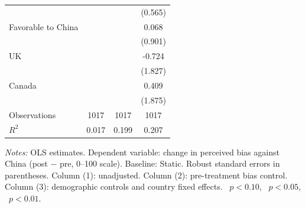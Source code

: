 \begin{table}[htbp]
\begin{tabular}{l*{3}{c}}
                    &                     &                     &     (0.565)         \\
\addlinespace
Favorable to China  &                     &                     &       0.068         \\
                    &                     &                     &     (0.901)         \\
\addlinespace
UK                  &                     &                     &      -0.724         \\
                    &                     &                     &     (1.827)         \\
\addlinespace
Canada              &                     &                     &       0.409         \\
                    &                     &                     &     (1.875)         \\
\midrule
Observations        &        1017         &        1017         &        1017         \\
$R^2$               &       0.017         &       0.199         &       0.207         \\
\bottomrule
\end{tabular}
\par\vspace{4pt}
\begin{minipage}{\textwidth}
\footnotesize \textit{Notes:} OLS estimates. Dependent variable: change in perceived bias against China (post $-$ pre, 0--100 scale). Baseline: Static. Robust standard errors in parentheses. Column (1): unadjusted. Column (2): pre-treatment bias control. Column (3): demographic controls and country fixed effects. \sym{*}~$p<0.10$, \sym{**}~$p<0.05$, \sym{***}~$p<0.01$.
\end{minipage}
\end{table}
